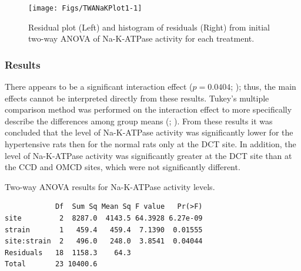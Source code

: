 \documentclass[10pt,openany]{book}\usepackage[]{graphicx}\usepackage[]{color}
\makeatletter
\newenvironment{kframe}{%
 \def\at@end@of@kframe{}%
 \ifinner\ifhmode%
  \def\at@end@of@kframe{\end{minipage}}%
  \begin{minipage}{\columnwidth}%
 \fi\fi%
 \def\FrameCommand##1{\hskip\@totalleftmargin \hskip-\fboxsep
 \colorbox{shadecolor}{##1}\hskip-\fboxsep
     \hskip-\linewidth \hskip-\@totalleftmargin \hskip\columnwidth}%
 \MakeFramed {\advance\hsize-\width
   \@totalleftmargin\z@ \linewidth\hsize
   \@setminipage}}%
 {\par\unskip\endMakeFramed%
 \at@end@of@kframe}
\newenvironment{knitrout}{}{} %
\makeatother
\begin{document}
\begin{knitrout}
\color{fgcolor}\begin{figure}[h]

{\centering \texttt{[image: Figs/TWANaKPlot1-1]} 

}

\caption[Residual plot (Left) and histogram of residuals (Right) from initial two-way ANOVA of Na-K-ATPase activity for each treatment]{Residual plot (Left) and histogram of residuals (Right) from initial two-way ANOVA of Na-K-ATPase activity for each treatment.}\label{fig:TWANaKPlot1}
\end{figure}


\end{knitrout}

\subsubsection*{Results}
There appears to be a significant interaction effect ($p=0.0404$; ); thus, the main effects cannot be interpreted directly from these results.  Tukey's multiple comparison method was performed on the interaction effect to more specifically describe the differences among group means (; ).  From these results it was concluded that the level of Na-K-ATPase activity was significantly lower for the hypertensive rats then for the normal rats only at the DCT site.  In addition, the level of Na-K-ATPase activity was significantly greater at the DCT site than at the CCD and OMCD sites, which were not significantly different.

\begin{table}[h]
  \centering
  \caption{Two-way ANOVA results for Na-K-ATPase activity levels.}\label{tab:TWANaKANOVA}
\begin{knitrout}
\color{fgcolor}\begin{kframe}
\begin{verbatim}
            Df  Sum Sq Mean Sq F value   Pr(>F)
site         2  8287.0  4143.5 64.3928 6.27e-09
strain       1   459.4   459.4  7.1390  0.01555
site:strain  2   496.0   248.0  3.8541  0.04044
Residuals   18  1158.3    64.3                 
Total       23 10400.6                         
\end{verbatim}
\end{kframe}
\end{knitrout}
\end{table}
\end{document}
